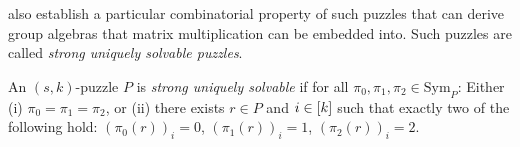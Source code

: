 \documentclass[11pt]{article}
\newcommand\Sym[1]{\ensuremath{\mathrm{Sym}_{#1}}}
\begin{document}
\cite{cksu05} also establish a particular combinatorial property of
such puzzles that can derive group algebras that matrix multiplication can be
embedded into.  Such puzzles are called \emph{strong uniquely
solvable puzzles}.





\begin{definition}
  \label{def:strong-USP}
  An $(s,k)$-puzzle $P$ is \emph{strong uniquely solvable} if for all
  $\pi_0, \pi_1, \pi_2 \in \Sym{P}$: Either (i) $\pi_0 = \pi_1 = \pi_2$,
  or (ii) there exists $r \in P$ and $i \in [k]$ such that exactly
  two of the following hold: $(\pi_0(r))_i = 0$, $(\pi_1(r))_i = 1$,
  $(\pi_2(r))_i = 2$.
\end{definition}
\end{document}
